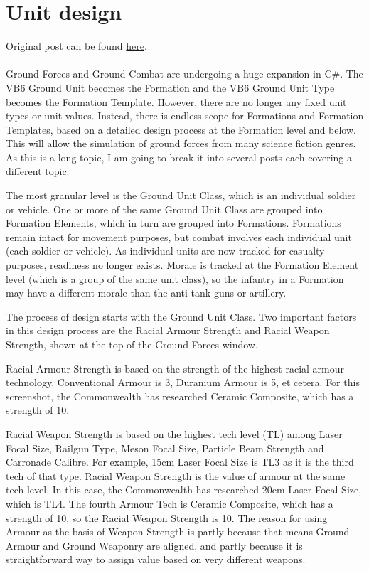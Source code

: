 \documentclass[../../../Aurora C# unofficial manual.tex]{subfiles}
\begin{document}
	\section{Unit design}
	Original post can be found
	\href{http://aurora2.pentarch.org/index.php?topic=8495.msg105824#msg105824}{here}.
	\\\\
	
	Ground Forces and Ground Combat are undergoing a huge expansion in C\#. The VB6 Ground Unit becomes the Formation and the VB6 Ground Unit Type becomes the Formation Template. However, there are no longer any fixed unit types or unit values. Instead, there is endless scope for Formations and Formation Templates, based on a detailed design process at the Formation level and below. This will allow the simulation of ground forces from many science fiction genres. As this is a long topic, I am going to break it into several posts each covering a different topic.
	
	The most granular level is the Ground Unit Class, which is an individual soldier or vehicle. One or more of the same Ground Unit Class are grouped into Formation Elements, which in turn are grouped into Formations. Formations remain intact for movement purposes, but combat involves each individual unit (each soldier or vehicle). As individual units are now tracked for casualty purposes, readiness no longer exists. Morale is tracked at the Formation Element level (which is a group of the same unit class), so the infantry in a Formation may have a different morale than the anti-tank guns or artillery.
	
	The process of design starts with the Ground Unit Class. Two important factors in this design process are the Racial Armour Strength and Racial Weapon Strength, shown at the top of the Ground Forces window.
	
	Racial Armour Strength is based on the strength of the highest racial armour technology. Conventional Armour is 3, Duranium Armour is 5, et cetera. For this screenshot, the Commonwealth has researched Ceramic Composite, which has a strength of 10.
	
	Racial Weapon Strength is based on the highest tech level (TL) among Laser Focal Size, Railgun Type, Meson Focal Size, Particle Beam Strength and Carronade Calibre. For example, 15cm Laser Focal Size is TL3 as it is the third tech of that type. Racial Weapon Strength is the value of armour at the same tech level. In this case, the Commonwealth has researched 20cm Laser Focal Size, which is TL4. The fourth Armour Tech is Ceramic Composite, which has a strength of 10, so the Racial Weapon Strength is 10. The reason for using Armour as the basis of Weapon Strength is partly because that means Ground Armour and Ground Weaponry are aligned, and partly because it is straightforward way to assign value based on very different weapons.
	
\end{document}
